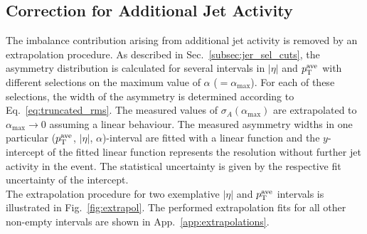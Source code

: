 \subsection{Correction for Additional Jet Activity}
\label{subsec:jer_corrections_alpha}
The imbalance contribution arising from additional jet activity is removed by an extrapolation procedure. As described in Sec.~\ref{subsec:jer_sel_cuts}, the asymmetry distribution is calculated for several intervals in $|\eta|$ and $p_{\text{T}}^\mathrm{ave}$ with different selections on the maximum value of $\alpha$ ($=\alpha_\mathrm{max}$). For each of these selections, the width of the asymmetry is determined according to Eq.~\ref{eq:truncated_rms}. The measured values of $\sigma_{A}(\alpha_\mathrm{max})$ are extrapolated to $\alpha_\mathrm{max} \rightarrow 0$ assuming a linear behaviour. The measured asymmetry widths in one particular ($p_{\text{T}}^\mathrm{ave}$, $|\eta|$, $\alpha$)-interval are fitted with a linear function and the $y$-intercept of the fitted linear function represents the resolution without further jet activity in the event. The statistical uncertainty is given by the respective fit uncertainty of the intercept. \\
The extrapolation procedure for two exemplative $|\eta|$ and $p_{\text{T}}^\mathrm{ave}$ intervals is illustrated in Fig.~\ref{fig:extrapol}. The performed extrapolation fits for all other non-empty intervals are shown in App.~\ref{app:extrapolations}. 
